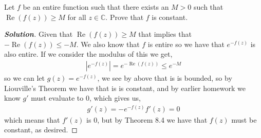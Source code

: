 \documentclass[11pt]{article}
\newenvironment{problem}[2][Problem\!]{\begin{trivlist}
\item[\hskip \labelsep {\bfseries #1}\hskip \labelsep {\bfseries #2}]}{\end{trivlist}}
\newenvironment{solution}{\begin{proof}[\textbf{\textit{Solution}}] }{\end{proof}}
\newcommand{\cc}{\mathbb C}   %
\newcommand{\abs}[1]{\left\lvert#1\right\rvert} %
\renewcommand{\geq}{\geqslant}
\renewcommand{\leq}{\leqslant}
\renewcommand{\Re}{\operatorname{Re}}
\begin{document}
\begin{problem}{8.4}
Let $f$ be an entire function such that there exists an $M > 0$ such that $\Re(f(z)) \geq M$ for all $z \in \cc$. Prove that $f$ is constant. 
\end{problem}
\begin{solution}
    Given that $\Re(f(z)) \geq M$ that implies that $-\Re(f(z)) \leq -M$. We also know that $f$ is entire so we have that $e^{-f(z)}$ is also entire. If we consider the modulus of this we get,
    \begin{align*}
        \abs{e^{-f(z)}} = e^{-\Re(f(z))} \leq e^{-M}
    \end{align*}
    so we can let $g(z) = e^{-f(z)}$, we see by above that is is bounded, so by Liouville’s Theorem we have that is is constant, and by earlier homework we know $g'$ must evaluate to 0, which gives us,
    \begin{align*}
        g'(z) = -e^{-f(z)}f'(z) = 0
    \end{align*}
    which means that $f'(z)$ is 0, but by Theorem 8.4 we have that $f(z)$ must be constant, as desired. 
\end{solution}

\newpage  %
\end{document}
